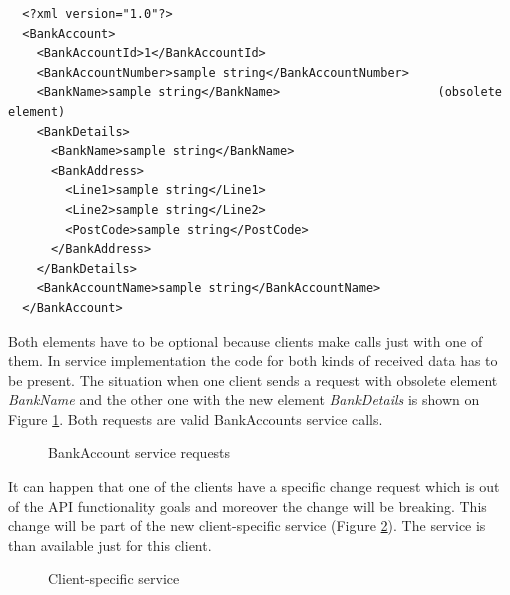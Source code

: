 \begin{lstlisting}
  <?xml version="1.0"?>
  <BankAccount>
    <BankAccountId>1</BankAccountId>
    <BankAccountNumber>sample string</BankAccountNumber>
    <BankName>sample string</BankName>                      (obsolete element)
    <BankDetails>
      <BankName>sample string</BankName>
      <BankAddress>
        <Line1>sample string</Line1>
        <Line2>sample string</Line2>
        <PostCode>sample string</PostCode>
      </BankAddress>
    </BankDetails>
    <BankAccountName>sample string</BankAccountName>
  </BankAccount>
\end{lstlisting}

Both elements have to be optional because clients make calls just with one of them. In service implementation the code for both kinds of received data has to be present. The situation when one client sends a request with obsolete element \emph{BankName} and the other one with the new element \emph{BankDetails} is shown on Figure \ref{fig:compatible-api-change}. Both requests are valid BankAccounts service calls.

\begin{figure}[htp] 
\caption{BankAccount service requests}
\label{fig:compatible-api-change}
\end{figure} 

It can happen that one of the clients have a specific change request which is out of the API functionality goals and moreover the change will be breaking. This change will be part of the new client-specific service (Figure \ref{fig:custom-service}). The service is than available just for this client. 

\begin{figure}[htp] 
\caption{Client-specific service}
\label{fig:custom-service}
\end{figure} 


